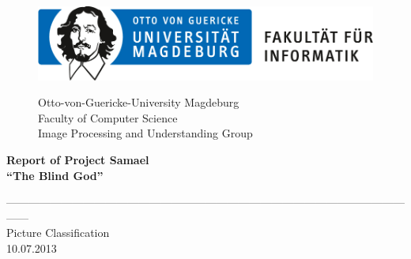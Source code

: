 \documentclass[liststotoc,11pt,a4paper]{article}
\begin{document}
\begin{figure}[htbp]
\begin{minipage}[t]{5cm}
\vspace{0pt}
\includegraphics{ovgu_logo_fak_inf}
\end{minipage}
\hfill
\begin{minipage}[t]{8cm}
\vspace{0pt}
\begin{flushright}     
Otto-von-Guericke-University Magdeburg\\Faculty of Computer Science\\Image Processing and Understanding Group\\
\end{flushright}
\end{minipage}
\end{figure}
\vspace{50pt}

\begin{center}
\huge\bfseries Report of Project Samael\\
\vspace{10pt}
\large"`The Blind God"'\\
\end{center}
\begin{center}
\vspace{20pt}
------------------------------------------------------------------------------------------------------------------\\[30pt]
\large Picture Classification\\
\vspace{10pt}
\normalsize 10.07.2013 \\[220pt] 
\end {center}
\end{document}
